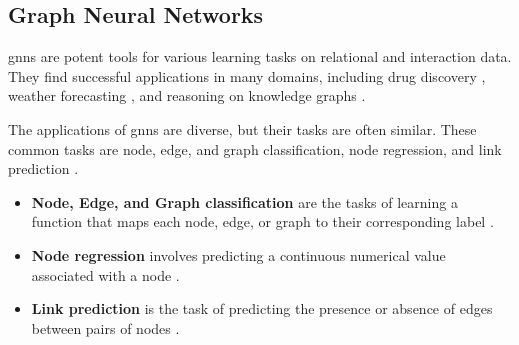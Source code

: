 

\subsection{Graph Neural Networks}
\label{s_Background_GNNs}



\glspl{gnn} are potent tools for various learning tasks on relational and interaction data. They find successful applications in many domains, including drug discovery \cite{dauparas_robust_2022}, weather forecasting \cite{lam_graphcast_2022}, and reasoning on knowledge graphs \cite{huang_few-shot_2022}. 

The applications of \glspl{gnn} are diverse, but their tasks are often similar. These common tasks are node, edge, and graph classification, node regression, and link prediction \cite{wu_comprehensive_2021, zhou_graph_2020}.
\begin{itemize}
    \item \textbf{Node, Edge, and Graph classification} are the tasks of learning a function that maps each node, edge, or graph to their corresponding label \cite{kipf_semi-supervised_2017}.
    \item \textbf{Node regression} involves predicting a continuous numerical value associated with a node \cite{thomas_graph_2023}.
    \item \textbf{Link prediction} is the task of predicting the presence or absence of edges between pairs of nodes \cite{liben-nowell_link-prediction_2007}.
\end{itemize}

